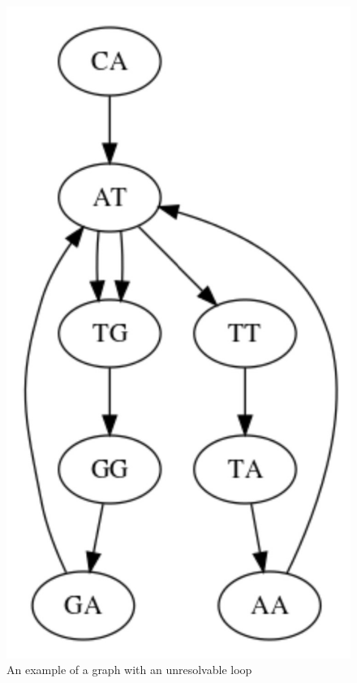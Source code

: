 \documentclass[letterpaper, 10 pt]{ieeeconf}
\begin{document}
\begin{figure}[thpb]
    \includegraphics[scale=0.4]{images/fig3-2.jpg}
    \caption{An example of a graph with an unresolvable loop}
    \label{fig3}
  \end{figure}
\end{document}

